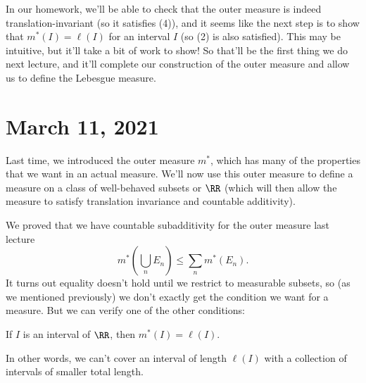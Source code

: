 In our homework, we'll be able to check that the outer measure is indeed translation-invariant (so it satisfies (4)), and it seems like the next step is to show that $m^\ast(I) = \ell(I)$ for an interval $I$ (so (2) is also satisfied). This may be intuitive, but it'll take a bit of work to show! So that'll be the first thing we do next lecture, and it'll complete our construction of the outer measure and allow us to define the Lebesgue measure.


\pagebreak\section*{March 11, 2021}

Last time, we introduced the outer measure $m^\ast$, which has many of the properties that we want in an actual measure. We'll now use this outer measure to define a measure on a class of well-behaved subsets or $\RR$ (which will then allow the measure to satisfy translation invariance and countable additivity). 

We proved that we have countable subadditivity for the outer measure last lecture
\[
    m^\ast \left(\bigcup_{n} E_n \right) \le \sum_n m^\ast(E_n).
\]
It turns out equality doesn't hold until we restrict to measurable subsets, so (as we mentioned previously) we don't exactly get the condition we want for a measure. But we can verify one of the other conditions:

\begin{proposition}
If $I$ is an interval of $\RR$, then $m^\ast(I) = \ell(I)$.
\end{proposition}

In other words, we can't cover an interval of length $\ell(I)$ with a collection of intervals of smaller total length.

